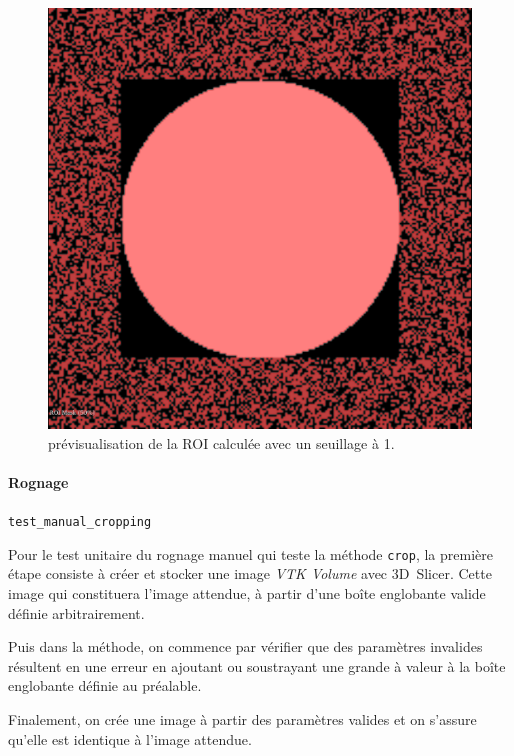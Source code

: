 \documentclass{article}
\newcommand{\subsubsubsection}[1]{\paragraph{#1}\par\noindent\bigskip}
\newcommand{\method}[1]{\hspace{1in}\texttt{#1}\bigskip}
\begin{document}
{{{{\begin{figure}[!p]
\begin{minipage}[t]{0.45\textwidth}
                        \includegraphics[width=\textwidth]{images/test-roi-selection-preview-1.png}
                        \caption{prévisualisation de la ROI calculée avec un seuillage à 1.}
                        \label{fig:test-roi-selection-preview-1}
                    \end{minipage}
                \end{figure}
            }

            {
                \bigskip
                \subsubsubsection{Rognage}
                \label{subsubsubsec:cropping-unit-testing}

                \method{test\_manual\_cropping}
                \label{method:test_manual_cropping}

                Pour le test unitaire du rognage manuel qui teste la méthode \texttt{crop}, la première étape consiste à créer et stocker une image \textit{VTK Volume} avec 3D~Slicer. Cette image qui constituera l'image attendue, à partir d'une boîte englobante valide définie arbitrairement.

                Puis dans la méthode, on commence par vérifier que des paramètres invalides résultent en une erreur en ajoutant ou soustrayant une grande à valeur à la boîte englobante définie au préalable.

                Finalement, on crée une image à partir des paramètres valides et on s'assure qu'elle est identique à l'image attendue.

}}}}
\end{document}
